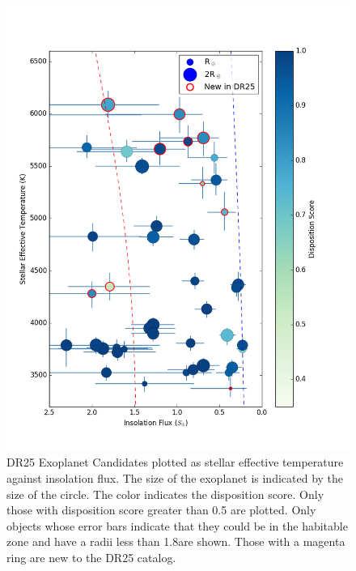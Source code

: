 


\begin{figure}
    \centering
    \includegraphics[width=1.1\linewidth]{fig-hzTstarInsol.png}
    \caption{DR25 Exoplanet Candidates plotted as stellar effective temperature against insolation flux. The size of the exoplanet is indicated by the size of the circle.  The color indicates the disposition score. Only those with disposition score greater than 0.5 are plotted.  Only objects whose error bars indicate that they could be in the habitable zone and have a radii less than 1.8\re are shown. Those with a magenta ring are new to the DR25 catalog. }
    \label{f:hzNarrow}
\end{figure}


